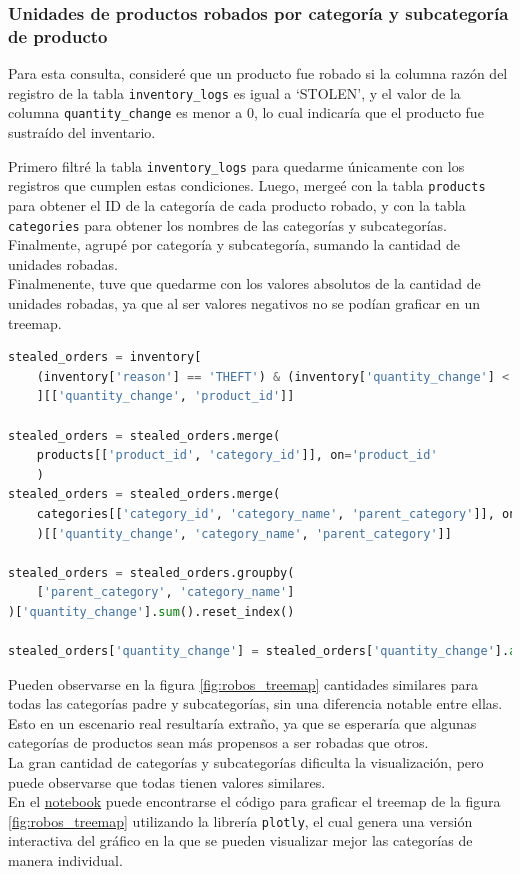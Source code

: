 \subsubsection{Unidades de productos robados por categoría y subcategoría de producto}

Para esta consulta, consideré que un producto fue robado si la columna razón del registro de la tabla \texttt{inventory\_logs} es igual a `STOLEN', y el valor de la columna \texttt{quantity\_change} es menor a 0, lo cual indicaría que el producto fue sustraído del inventario.

Primero filtré la tabla \texttt{inventory\_logs} para quedarme únicamente con los registros que cumplen estas condiciones. Luego, mergeé con la tabla \texttt{products} para obtener el ID de la categoría de cada producto robado, y con la tabla \texttt{categories} para obtener los nombres de las categorías y subcategorías. Finalmente, agrupé por categoría y subcategoría, sumando la cantidad de unidades robadas.\\
Finalmenente, tuve que quedarme con los valores absolutos de la cantidad de unidades robadas, ya que al ser valores negativos no se podían graficar en un treemap.

\begin{lstlisting}[language=Python, xleftmargin=55pt, xrightmargin=55pt]
stealed_orders = inventory[
    (inventory['reason'] == 'THEFT') & (inventory['quantity_change'] < 0)
    ][['quantity_change', 'product_id']]

stealed_orders = stealed_orders.merge(
    products[['product_id', 'category_id']], on='product_id'
    )
stealed_orders = stealed_orders.merge(
    categories[['category_id', 'category_name', 'parent_category']], on='category_id'
    )[['quantity_change', 'category_name', 'parent_category']]

stealed_orders = stealed_orders.groupby(
    ['parent_category', 'category_name']
)['quantity_change'].sum().reset_index()

stealed_orders['quantity_change'] = stealed_orders['quantity_change'].abs()
\end{lstlisting}

Pueden observarse en la figura \ref{fig:robos_treemap} cantidades similares para todas las categorías padre y subcategorías, sin una diferencia notable entre ellas. Esto en un escenario real resultaría extraño, ya que se esperaría que algunas categorías de productos sean más propensos a ser robadas que otros.\\
La gran cantidad de categorías y subcategorías dificulta la visualización, pero puede observarse que todas tienen valores similares. \\
En el \href{https://github.com/patricioibar/datos-tp1/blob/main/consultas_propias.ipynb}{notebook} puede encontrarse el código para graficar el treemap de la figura \ref{fig:robos_treemap} utilizando la librería \texttt{plotly}, el cual genera una versión interactiva del gráfico en la que se pueden visualizar mejor las categorías de manera individual.

